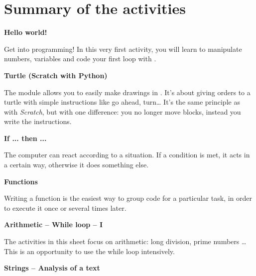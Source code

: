 \cleardoublepage
\thispagestyle{empty}
\tableofcontents


\newpage


\section*{Summary of the activities}


\newcommand{\titreactivite}[1]{{\textbf{#1}}\nopagebreak}
\newcommand{\descriptionactivite}[1]{%
\smallskip\hfill
\begin{minipage}{0.95\textwidth}\small#1\end{minipage}\medskip\smallskip}

\titreactivite{Hello world!}

\descriptionactivite{Get into programming! In this very first activity, you will learn to manipulate numbers, variables and code your first loop with \Python.}

\titreactivite{Turtle (Scratch with Python)}

\descriptionactivite{The  module allows you to easily make drawings in \Python. It's about giving orders to a turtle with simple instructions like \og{}go ahead\fg{}, \og{}turn\fg{}\ldots{} It's the same principle as with \emph{Scratch}, but with one difference: you no longer move blocks, instead you write the instructions.}

\titreactivite{If ... then ...}

\descriptionactivite{The computer can react according to a situation. 
If a condition is met, it acts in a certain way, otherwise it does something else.}

\titreactivite{Functions}

\descriptionactivite{Writing a function is the easiest way to group code for a particular task, in order to execute it once or several times later.}

\titreactivite{Arithmetic -- While loop -- I}

\descriptionactivite{The activities in this sheet focus on arithmetic: long division, prime numbers \ldots{} This is an opportunity to use the \og{}while\fg{} loop intensively.}

\titreactivite{Strings -- Analysis of a text}

